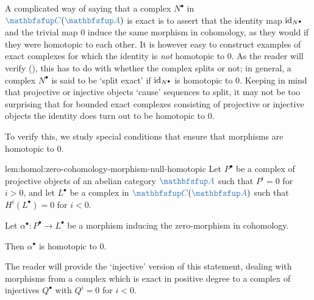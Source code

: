 A complicated way of saying that a complex $N^\bullet$ in
$\categ{C}(\categ{A})$ is exact is to assert that the identity map
$\operatorname{id}_{N^\bullet}$ and the trivial map $0$ induce the same morphism in
cohomology, as they would if they were homotopic to each other. It is
however easy to construct examples of exact complexes for which the
identity is \emph{not} homotopic to $0$. As the reader will verify
(), this has to
do with whether the complex splits or not; in general, a complex
$N^\bullet$ is said to be `split exact' if $\operatorname{id}_{N^\bullet}$ is
homotopic to $0$. Keeping in mind that projective or injective objects
`cause' sequences to split, it may not be too surprising that for
bounded exact complexes consisting of projective or injective objects
the identity does turn out to be homotopic to $0$.

To verify this, we study special conditions that ensure that morphisms
are homotopic to $0$.
\begin{lem}{}{lem:homol:zero-cohomology-morphism-null-homotopic}
  Let $P^\bullet$ be a complex of projective objects of an abelian
  category $\categ{A}$ such that $P^i = 0$ for $i > 0$, and let
  $L^\bullet$ be a complex in $\categ{C}(\categ{A})$ such that
  $H^i(L^\bullet) = 0$ for $i < 0$.

  Let $\alpha^\bullet : P^\bullet \to L^\bullet$ be a morphism
  inducing the zero-morphism in cohomology.

  Then $\alpha^\bullet$ is homotopic to $0$.
\end{lem}

The reader will provide the `injective' version of this statement,
dealing with morphisms from a complex which is exact in positive
degree to a complex of injectives $Q^\bullet$ with $Q^i = 0$ for
$i < 0$.

